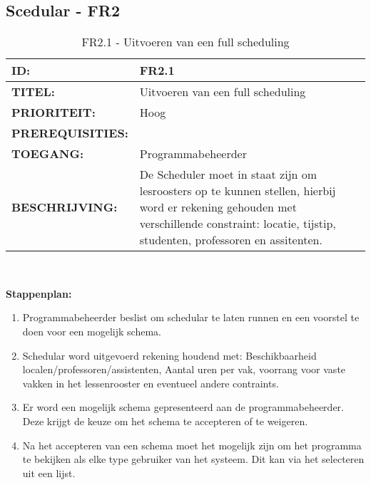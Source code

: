 \subsection{Scedular - FR2}

\noindent\begin{table}[H]
            \begin{tabular}{l | p{10cm}}
                \textbf{ID:} & FR2.1 \\ \hline
                \textbf{TITEL:} & Uitvoeren van een full scheduling\\ \hline
                \textbf{PRIORITEIT:} &  Hoog \\ \hline
                \textbf{PREREQUISITIES:} & \\ \hline
                \textbf{TOEGANG:} & Programmabeheerder \\ \hline
                \textbf{BESCHRIJVING:} & De Scheduler moet in staat zijn om lesroosters op te kunnen stellen, hierbij word er rekening gehouden met verschillende constraint: locatie, tijstip, studenten, professoren en assitenten. \\
            \end{tabular}\\
            \caption{FR2.1 - Uitvoeren van een full scheduling}
            \label{tab:FR2.1 - Uitvoeren van een full scheduling}
        \end{table}
      
\textbf{Stappenplan:}
	\begin{enumerate}
	\item Programmabeheerder beslist om schedular te laten runnen en een voorstel te doen voor een mogelijk schema.
	\item Schedular word uitgevoerd rekening houdend met: Beschikbaarheid localen/professoren/assistenten, Aantal uren per vak, voorrang voor vaste vakken in het lessenrooster en eventueel andere contraints.
	\item Er word een mogelijk schema gepresenteerd aan de programmabeheerder. Deze krijgt de keuze om het schema te accepteren of te weigeren.
	\item Na het accepteren van een schema moet het mogelijk zijn om het programma te bekijken als elke type gebruiker van het systeem. Dit kan via het selecteren uit een lijst.
	\end{enumerate}

